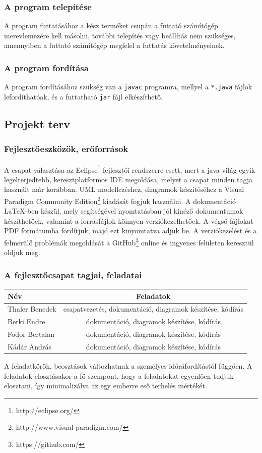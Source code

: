     \subsubsection{A program telepítése}
A program futtatásához a kész terméket csupán a futtató számítógép merevlemezére kell másolni, további telepítés vagy beállítás nem szükséges, amennyiben a futtató számítógép megfelel a futtatás követelményeinek.

    \subsubsection{A program fordítása}
A program fordításához szükség van a \texttt{javac} programra, mellyel a \texttt{*.java} fájlok lefordíthatóak, és a futtatható \texttt{jar} fájl elkészíthető.
    
\subsection{Projekt terv}

    \subsubsection{Fejlesztőeszközök, erőforrások}
	A csapat választása az Eclipse\footnote{http://eclipse.org/} fejlesztői rendszerre esett, mert a java világ egyik legelterjedtebb, keresztplatformos IDE megoldása, melyet a csapat minden tagja használt már korábban. UML modellezéshez, diagramok készítéséhez a Visual Paradigm Community Edition\footnote{http://www.visual-paradigm.com/} kiadását fogjuk használni.
A dokumentáció \LaTeX -ben készül, mely segítségével nyomtatásban jól kinéző dokumentumok készíthetőek, valamint a forrásfájlok könnyen verziókezelhetőek. A végső fájlokat PDF formátumba fordítjuk, majd ezt kinyomtatva adjuk be. A verziókezelést és a felmerülő problémák megoldását a GitHub\footnote{https://github.com/} online és ingyenes felületen keresztül oldjuk meg.

    \subsubsection{A fejlesztőcsapat tagjai, feladatai}
	\begin{center}
	\begin{tabular} {| l | c | }
		\hline
		Név & Feladatok\\
		\hline
		Thaler Benedek & csapatvezetés, dokumentáció, diagramok készítése, kódírás \\ 
		\hline
		Berki Endre & dokumentáció, diagramok készítése, kódírás \\
		\hline
		Fodor Bertalan & dokumentáció, diagramok készítése, kódírás \\
		\hline
		Kádár András & dokumentáció, diagramok készítése, kódírás \\
		\hline
	\end{tabular}
	\end{center}
	A feladatkörök, beosztások változhatnak a személyes időráfordítástól függően. A feladatok elosztásakor a fő szempont, hogy a feladatokat egyenlően tudjuk elosztani, így minimalizálva az egy emberre eső terhelés mértékét.

